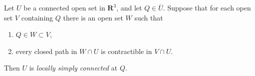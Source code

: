Let $U$ be a connected open set in $\mathbf{R}^3$, and let $Q \in \overline{U}$. Suppose that for each open set $V$ containing $Q$ there is an open set $W$ such that
\begin{enumerate}
\item $Q \in W \subset V$,
\item every closed path in $W \cap U$ is contractible in $V \cap U$.
\end{enumerate}
Then $U$ is \textit{locally simply connected} at $Q$.

